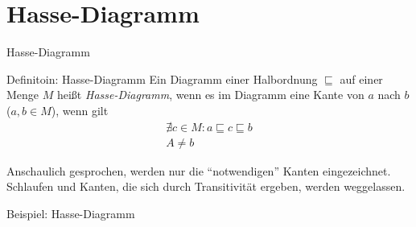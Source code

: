 \section{Hasse-Diagramm}
\begin{frame}{Hasse-Diagramm}
    \begin{block}{Definitoin: Hasse-Diagramm}
        Ein Diagramm einer Halbordnung $\sqsubseteq$ auf einer Menge $M$ heißt \emph{Hasse-Diagramm}, wenn es im Diagramm eine Kante von $a$ nach $b$ ($a,b \in M$), wenn gilt
        \begin{align*}
            \nexists c \in M: a\sqsubseteq c \sqsubseteq b\\
            A \neq b
        \end{align*}
    \end{block}
    Anschaulich gesprochen, werden nur die ``notwendigen'' Kanten eingezeichnet. Schlaufen und Kanten, die sich durch Transitivität ergeben, werden weggelassen.
\end{frame}
\begin{frame}{Beispiel: Hasse-Diagramm}
    \begin{figure}
    \centering
    \end{figure}
\end{frame}
